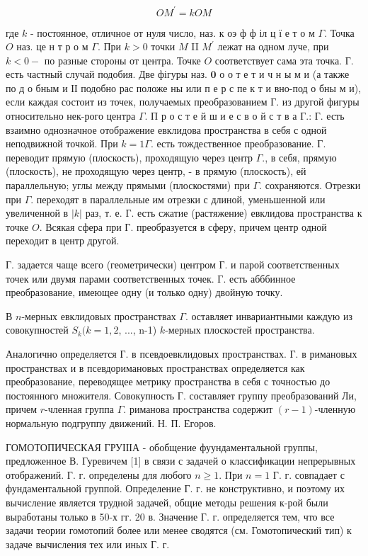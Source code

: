 \documentclass[10pt]{article}
\begin{document}
\[

O M^{\prime}=k O M

\]



где $k$ - постоянное, отличное от нуля число, наз. к оэ ф ф іл ц ї е т о м $\Gamma$. Точка $O$ наз. це н т р о м $\Gamma$. При $k>0$ точки $M$ II $M^{\prime}$ лежат на одном луче, при $k<0-$ по разные стороны от центра. Точке $O$ соответствует сама эта точка. Г. есть частный случай подобия. Две фігуры наз. $\mathbf{0}$ о о т е т и ч н ы м и (а также по д о бным и ІІ подобно рас положе ны или п е р с пе к т и вно-под о бны м и), если каждая состоит из точек, получаемых преобразованием Г. из другой фигуры относительно нек-рого центра $\Gamma$. П р о с т е й ш и е с в о й с т в а Г.: Г. есть взаимно однозначное отображение евклидова пространства в себя с одной неподвижной точкой. При $k=1 \Gamma$. есть тождественное преобразование. Г. переводит прямую (плоскость), проходящую через центр $\Gamma$., в себя, прямую (плоскость), не проходящую через центр, - в прямую (плоскость), ей параллельную; углы между прямыми (плоскостями) при $\Gamma$. сохраняются. Отрезки при $\Gamma$. переходят в параллельные им отрезки с длиной, уменьшенной или увеличенной в $|k|$ раз, т. е. $Г$. есть сжатие (растяжение) евклидова пространства к точке $O$. Всякая сфера при Г. преобразуется в сферу, причем центр одной переходит в центр другой.



Г. задается чаще всего (геометрически) центром Г. и парой соответственных точек или двумя парами соответственных точек. Г. есть абббинное преобразование, имеющее одну (и только одну) двойную точку.



В $n$-мерных евклидовых пространствах $\Gamma$. оставляет инвариантными каждую из совокупностей $S_{k}(k=1,2$, ..., n-1) $k$-мерных плоскостей пространства.



Аналогично определяется Г. в псевдоевклидовых пространствах. Г. в римановых пространствах и в псевдоримановых пространствах определяется как преобразование, переводящее метрику пространства в себя с точностью до постоянного множителя. Совокупность Г. составляет группу преобразований Ли, причем $r$-членная группа $\Gamma$. риманова пространства содержит $(r-1)$-членную нормальную подгруппу движений. Н. П. Егоров.



ГОМОТОПИЧЕСКАЯ ГРУІІІА - обобщение фуундаментальной группы, предложенное В. Гуревичем [1] в связи с задачей о классификации непрерывных отображений. Г. г. определены для любого $n \geqslant 1$. При $n=1$ Г. г. совпадает с фундаментальной группой. Определение Г. г. не конструктивно, и поэтому их вычисление является трудной задачей, общие методы решения к-рой были выработаны только в 50-х гг. 20 в. Значение Г. г. определяется тем, что все задачи теории гомотопий более или менее сводятся (см. Гомотопический тип) к задаче вычисления тех или иных Г. г.
\end{document}
